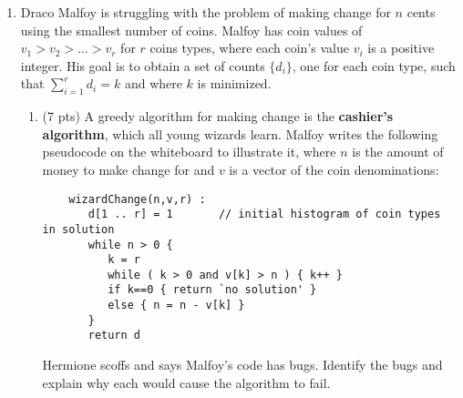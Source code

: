 \documentclass[12pt]{article}
\begin{document}
\begin{enumerate}
\begin{enumerate}
	
	\item \label{2c} (10 pts) Produce a plot showing (i) the length of the longest chain (were we to use chaining for resolving collisions under $h(x)$) as a function of the number $n$ of these strings that we hash into a table with $\ell=175$ buckets, (ii) the exact upper bound on the depth of a balanced binary tree with $n$ items stored, and (iii) the length of the longest chain were we to use a uniform hash instead of $h(x)$. Include a guide of $c\,n$, that is, graph $c n$ on the same chart, for some value of $c$ you find useful, so that you can compare this graph to that of your data.
	
	Then, comment on (i) how much shorter the longest chain would be under a uniform hash than under $h(x)$, and (ii)  the value of $n$ at which the balanced binary tree becomes a more efficient data structure than $h(x)$ and separately a uniform hash.
	\pagebreak

	\end{enumerate}
	


	\item Draco Malfoy is struggling with the problem of making change for $n$ cents using the smallest number of coins. Malfoy has coin values of $v_{1} > v_{2} > \dots > v_{r}$ for $r$ coins types, where each coin's value $v_{i}$ is a positive integer. His goal is to obtain a set of counts $\{d_{i}\}$, one for each coin type, such that $\sum_{i=1}^{r}d_{i}=k$ and where $k$ is minimized.
	\begin{enumerate}
	\item \label{3a} (7 pts) A greedy algorithm for making change is the \textbf{cashier's algorithm}, which all young wizards learn. Malfoy writes the following pseudocode on the whiteboard to illustrate it, where $n$ is the amount of money to make change for and $v$ is a vector of the coin denominations:
	\begin{small}
	\begin{verbatim}
	wizardChange(n,v,r) :
	   d[1 .. r] = 1       // initial histogram of coin types in solution
	   while n > 0 {
	      k = r
	      while ( k > 0 and v[k] > n ) { k++ }
	      if k==0 { return `no solution' }
	      else { n = n - v[k] }
	   }
	   return d
	\end{verbatim}
	\end{small}
	Hermione scoffs and says Malfoy's code has bugs. Identify the bugs and explain why each would cause the algorithm to fail.
	\pagebreak
	


\end{enumerate}
\end{enumerate}
\end{document}
